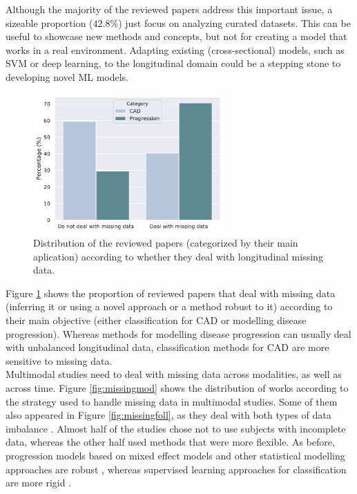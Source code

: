 Although the majority of the reviewed papers address this important issue, a sizeable proportion ($42.8 \%$) just focus on analyzing curated datasets. This can be useful to showcase new methods and concepts, but not for creating a model that works in a real environment. Adapting existing (cross-sectional) models, such as SVM or deep learning, to the longitudinal domain \cite{Adhikari2019,Ghazi2019,Jie2017,Zhu2016a} could be a stepping stone to developing novel ML models. \\

\begin{figure}[!htbp]
\centering
\includegraphics[width=0.65\textwidth]{figures/review/Fig8.pdf}
    \caption[Distribution of the reviewed papers according to whether they deal with longitudinal missing data.]{Distribution of the reviewed papers (categorized by their main aplication) according to whether they deal with longitudinal missing data.}
    \label{fig:missingcat}
\end{figure}

Figure \ref{fig:missingcat} shows the proportion of reviewed papers that deal with missing data (inferring it or using a novel approach or a method robust to it) according to their main objective (either classification for CAD or modelling disease progression). Whereas methods for modelling disease progression can usually deal with unbalanced longitudinal data, classification methods for CAD are more sensitive to missing data.  \\

Multimodal studies need to deal with missing data across modalities, as well as across time. Figure \ref{fig:missingmod} shows the distribution of works according to the strategy used to handle missing data in multimodal studies. Some of them also appeared in Figure \ref{fig:missingfoll}, as they deal with both types of data imbalance \cite{Adhikari2019,Goyal2018,Iturria-Medina2016,Jedynak2012}. Almost half of the studies chose not to use subjects with incomplete data, whereas the other half used methods that were more flexible. As before, progression models based on mixed effect models and other statistical modelling approaches are robust \cite{Iturria-Medina2016,Jedynak2012,Schmidt-Richberg2015,Villemagne2013}, whereas supervised learning approaches for classification are more rigid \cite{Vounou2012,Young2014,Zhang2012a}. \\

